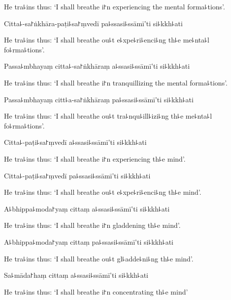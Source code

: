 \begin{english}
  He tra꜕ins thus: `I shall breathe i꜓n experiencing the mental forma꜕tions'.
\end{english}

Citta꜕-sa꜓ṅkhāra-paṭi꜕sa꜓ṃvedī pa꜕ssasi꜕ssāmī'ti si꜕kkh꜕ati

\begin{english}
  He tra꜕ins thus: `I shall breathe ou꜕t e꜕xpe꜕ri꜕enci꜕ng th꜕e me꜕nta꜕l fo꜕rma꜕tions'.
\end{english}

Passa꜕mbhayaṃ citta꜕-sa꜓ṅkhāraṃ a꜕ssasi꜕ssāmī'ti si꜕kkh꜕ati

\begin{english}
  He tra꜕ins thus: `I shall breathe i꜓n tranquillizing the mental forma꜕tions'.
\end{english}

Passa꜕mbhayaṃ citt꜕a-sa꜓ṅkhāraṃ pa꜕ssasi꜕ssāmī'ti si꜕kkh꜕ati

\begin{english}
  He tra꜕ins thus: `I shall breathe ou꜕t tra꜕nqu꜕ill꜕izi꜕ng th꜕e me꜕nta꜕l fo꜕rma꜕tions'.
\end{english}

Citta꜕-paṭi꜕sa꜓ṃvedī a꜕ssasi꜕ssāmī'ti si꜕kkh꜕ati

\begin{english}
  He tra꜕ins thus: `I shall breathe i꜓n experiencing th꜕e mind'.
\end{english}

Citta꜕-paṭi꜕sa꜓ṃvedī pa꜕ssasi꜕ssāmī'ti si꜕kkh꜕ati

\begin{english}
  He tra꜕ins thus: `I shall breathe ou꜕t e꜕xpe꜕ri꜕enci꜕ng th꜕e mind'.
\end{english}

A꜕bhippa꜕moda꜓yaṃ cittaṃ a꜕ssasi꜕ssāmī'ti si꜕kkh꜕ati

\begin{english}
  He tra꜕ins thus: `I shall breathe i꜓n gladdening th꜕e mind'.
\end{english}

A꜕bhippa꜕moda꜓yaṃ cittaṃ pa꜕ssasi꜕ssāmī'ti si꜕kkh꜕ati

\begin{english}
  He tra꜕ins thus: `I shall breathe ou꜕t gl꜕adde꜕ni꜕ng th꜕e mind'.
\end{english}

Sa꜕māda꜓haṃ cittaṃ a꜕ssasi꜕ssāmī'ti si꜕kkh꜕ati

\begin{english}
  He tra꜕ins thus: `I shall breathe i꜓n concentrating th꜕e mind'
\end{english}

